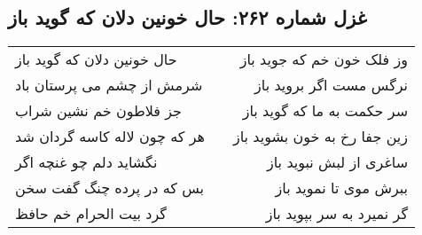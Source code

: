 \begin{center}
\section*{غزل شماره ۲۶۲: حال خونین دلان که گوید باز}
\label{sec:sh262}
\begin{longtable}{l p{0.5cm} r}
حال خونین دلان که گوید باز
&&
وز فلک خون خم که جوید باز
\\
شرمش از چشم می پرستان باد
&&
نرگس مست اگر بروید باز
\\
جز فلاطون خم نشین شراب
&&
سر حکمت به ما که گوید باز
\\
هر که چون لاله کاسه گردان شد
&&
زین جفا رخ به خون بشوید باز
\\
نگشاید دلم چو غنچه اگر
&&
ساغری از لبش نبوید باز
\\
بس که در پرده چنگ گفت سخن
&&
ببرش موی تا نموید باز
\\
گرد بیت الحرام خم حافظ
&&
گر نمیرد به سر بپوید باز
\\
\end{longtable}
\end{center}
